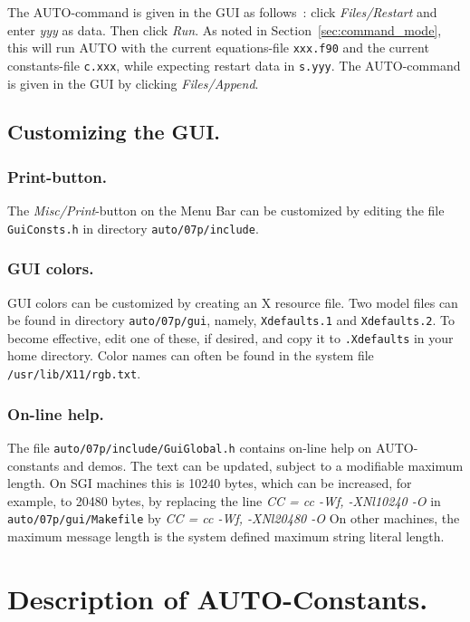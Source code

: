 \documentclass[12pt]{report}
\begin{document}
The {\cal AUTO}-command  is given in the GUI as follows~:
click {\it Files/Restart} and enter {\it yyy} as data.
Then click {\it Run}.
As noted in Section~\ref{sec:command_mode}, 
this will run {\cal AUTO} with the current equations-file
{\tt xxx.f90} and the current constants-file {\tt c.xxx}, 
while expecting restart data in {\tt s.yyy}.
The {\cal AUTO}-command  is given in the GUI by
clicking {\it Files/Append}.

\section{ Customizing the GUI.} \label{sec:Customizing_the_GUI}
\subsection{ Print-button.}
The {\it Misc/Print}-button on the Menu Bar can be customized 
by editing the file {\tt GuiConsts.h} in directory {\tt auto/07p/include}.

\subsection{ GUI colors.}
GUI colors can be customized by creating an X resource file.
Two model files can be found in directory {\tt auto/07p/gui}, namely,
{\tt Xdefaults.1} and {\tt Xdefaults.2}.
To become effective, edit one of these, if desired,
and copy it to {\tt .Xdefaults} in your home directory.
Color names can often be found in the system file {\tt /usr/lib/X11/rgb.txt}.

\subsection{ On-line help.}
The file {\tt auto/07p/include/GuiGlobal.h}
contains on-line help on {\cal AUTO}-constants and demos.
The text can be updated, subject to a modifiable maximum length.
On SGI machines this is 10240 bytes,
which can be increased, for example, to 20480 bytes, 
by replacing the line
{\it CC = cc -Wf, -XNl10240 -O}
in {\tt auto/07p/gui/Makefile} by
{\it CC = cc -Wf, -XNl20480 -O}
On other machines, the maximum message length is the system defined maximum
string literal length.


\chapter{ Description of {\cal AUTO}-Constants.} \label{ch:AUTO_constants}
\end{document}
